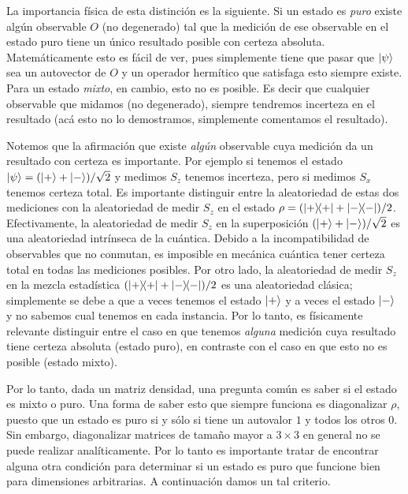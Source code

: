 \documentclass[10pt, a4paper]{article}
\numberwithin{equation}{subsection}
\begin{document}
La importancia física de esta distinción es la siguiente. Si un estado es
\emph{puro} existe algún observable $O$ (no degenerado) tal que la medición de
ese observable en el estado puro tiene un único resultado posible con certeza
absoluta. Matemáticamente esto es fácil de ver, pues simplemente tiene que
pasar que $\ket{\psi}$ sea un autovector de $O$ y un operador hermítico que
satisfaga esto siempre existe. Para un estado \emph{mixto}, en cambio, esto no
es posible. Es decir que cualquier observable que midamos (no degenerado),
siempre tendremos incerteza en el resultado (acá esto no lo demostramos,
simplemente comentamos el resultado).

Notemos que la afirmación que existe \emph{algún} observable cuya medición da
un resultado con certeza es importante. Por ejemplo si tenemos el estado
$\ket{\psi} = (\ket{+} + \ket{-})/\sqrt{2}$ y medimos $S_z$ tenemos incerteza,
pero si medimos $S_x$ tenemos certeza total. Es importante distinguir entre la
aleatoriedad de estas dos mediciones con la aleatoriedad de medir $S_z$ en el
estado $\rho = (\projector{+} + \projector{-})/2$. Efectivamente, la
aleatoriedad de medir $S_z$ en la superposición $(\ket{+} + \ket{-})/\sqrt{2}$
es una aleatoriedad intrínseca de la cuántica. Debido a la incompatibilidad de
observables que no conmutan, es imposible en mecánica cuántica tener certeza
total en todas las mediciones posibles. Por otro lado, la aleatoriedad de medir
$S_z$ en la mezcla estadística $(\projector{+} + \projector{-})/2$ es una
aleatoriedad clásica; simplemente se debe a que a veces tenemos el estado
$\ket{+}$ y a veces el estado $\ket{-}$ y no sabemos cual tenemos en cada
instancia. Por lo tanto, es físicamente relevante distinguir entre el caso en
que tenemos \emph{alguna} medición cuya resultado tiene certeza absoluta
(estado puro), en contraste con el caso en que esto no es posible (estado
mixto).

\bigbreak

Por lo tanto, dada un matriz densidad, una pregunta común es saber si el estado
es mixto o puro. Una forma de saber esto que siempre funciona es diagonalizar
$\rho$, puesto que un estado es puro si y sólo si tiene un autovalor $1$ y
todos los otros $0$. Sin embargo, diagonalizar matrices de tamaño mayor a
$3\times3$ en general no se puede realizar analíticamente. Por lo tanto es
importante tratar de encontrar alguna otra condición para determinar si un
estado es puro que funcione bien para dimensiones arbitrarias. A continuación
damos un tal criterio.
\end{document}
